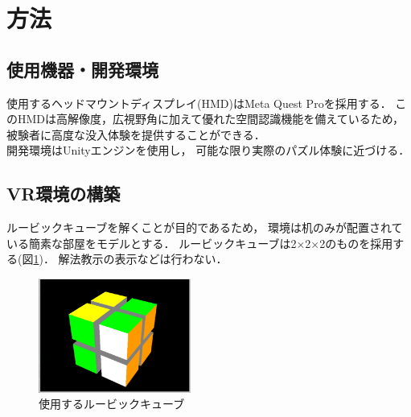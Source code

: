 \newpage
\section{方法}
  \subsection{使用機器・開発環境}
    使用するヘッドマウントディスプレイ(HMD)はMeta Quest Proを採用する．
    このHMDは高解像度，広視野角に加えて優れた空間認識機能を備えているため，
    被験者に高度な没入体験を提供することができる．
    \\\indent
    開発環境はUnityエンジンを使用し，
    可能な限り実際のパズル体験に近づける．
    \\\indent

  \subsection{VR環境の構築}
    ルービックキューブを解くことが目的であるため，
    環境は机のみが配置されている簡素な部屋をモデルとする．
    ルービックキューブは2×2×2のものを採用する(図\ref{cube})．
    解法教示の表示などは行わない．
    \begin{figure}[h]
      \begin{center}
        \includegraphics[width=50mm]{./images/cube.png}
        \caption{使用するルービックキューブ}\label{cube}
      \end{center}
    \end{figure}

